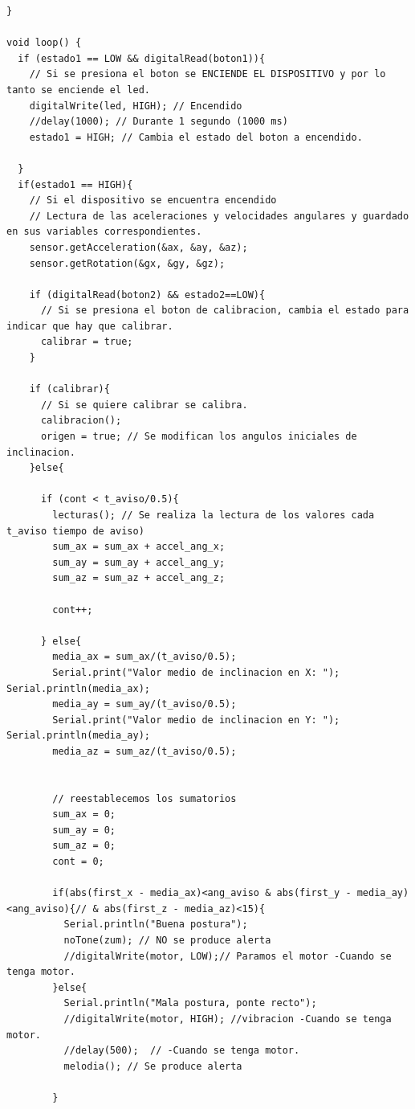 \begin{lstlisting}
}

void loop() {
  if (estado1 == LOW && digitalRead(boton1)){
    // Si se presiona el boton se ENCIENDE EL DISPOSITIVO y por lo tanto se enciende el led.
    digitalWrite(led, HIGH); // Encendido
    //delay(1000); // Durante 1 segundo (1000 ms)
    estado1 = HIGH; // Cambia el estado del boton a encendido.
    
  }
  if(estado1 == HIGH){
    // Si el dispositivo se encuentra encendido
    // Lectura de las aceleraciones y velocidades angulares y guardado en sus variables correspondientes.
    sensor.getAcceleration(&ax, &ay, &az); 
    sensor.getRotation(&gx, &gy, &gz);

    if (digitalRead(boton2) && estado2==LOW){
      // Si se presiona el boton de calibracion, cambia el estado para indicar que hay que calibrar.
      calibrar = true;
    }

    if (calibrar){
      // Si se quiere calibrar se calibra.
      calibracion();
      origen = true; // Se modifican los angulos iniciales de inclinacion.
    }else{
      
      if (cont < t_aviso/0.5){
        lecturas(); // Se realiza la lectura de los valores cada t_aviso tiempo de aviso)
        sum_ax = sum_ax + accel_ang_x;
        sum_ay = sum_ay + accel_ang_y; 
        sum_az = sum_az + accel_ang_z;

        cont++;

      } else{
        media_ax = sum_ax/(t_aviso/0.5);
        Serial.print("Valor medio de inclinacion en X: "); Serial.println(media_ax);
        media_ay = sum_ay/(t_aviso/0.5);
        Serial.print("Valor medio de inclinacion en Y: "); Serial.println(media_ay);
        media_az = sum_az/(t_aviso/0.5);
        

        // reestablecemos los sumatorios
        sum_ax = 0; 
        sum_ay = 0; 
        sum_az = 0; 
        cont = 0;

        if(abs(first_x - media_ax)<ang_aviso & abs(first_y - media_ay)<ang_aviso){// & abs(first_z - media_az)<15){
          Serial.println("Buena postura");
          noTone(zum); // NO se produce alerta
          //digitalWrite(motor, LOW);// Paramos el motor -Cuando se tenga motor.
        }else{
          Serial.println("Mala postura, ponte recto");
          //digitalWrite(motor, HIGH); //vibracion -Cuando se tenga motor.
          //delay(500);  // -Cuando se tenga motor.
          melodia(); // Se produce alerta
          
        }


\end{lstlisting}
